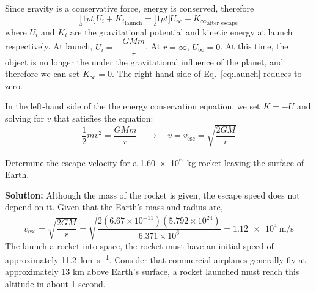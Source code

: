 Since gravity is a conservative force, energy is conserved, therefore
\begin{equation}
  \underbracket[1pt]{U_i+K_i}_\text{launch}=
  \underbracket[1pt]{U_\infty+K_\infty}_\text{after escape}
  \label{eq:launch}
\end{equation}
where $U_i$ and $K_i$ are the gravitational potential and kinetic energy at
launch respectively. At launch, $U_i=-\dfrac{GMm}r$. At $r=\infty$, $U_\infty=0$.
At this time, the object is no longer the under the gravitational influence
of the planet, and therefore we can set  $K_\infty=0$. The right-hand-side of
Eq.~\ref{eq:launch} reduces to zero.

In the left-hand side of the the energy conservation equation, we set $K=-U$
and solving for $v$ that satisfies the equation:
\begin{equation}
  \frac12mv^2=\frac{GMm}r
  \quad\longrightarrow\quad
  v=\boxed{v_\text{esc}=\sqrt{\frac{2GM}r}}
\end{equation}





\begin{example}
  Determine the escape velocity for a
  \SI{1.60e6}{\kilo\gram} rocket leaving the surface of Earth.

  \textbf{Solution:} Although the mass of the rocket is given,
  the escape speed does not depend on it. Given that the Earth's mass and
  radius are, 
  \begin{equation*}
    v_\text{esc}=\sqrt{\frac{2GM}r}
    =\sqrt{\frac{2(6.67\times10^{-11})(5.792\times10^{24})}{6.371\times10^6}}=
    \boxed{\SI{1.12e4}{\metre\per\second}}
  \end{equation*}
  The launch a rocket into space, the rocket must have an initial speed of
  approximately \SI{11.2}{\kilo\metre\per\second}. Consider that commercial
  airplanes generally fly at approximately 13 km above Earth's surface, a
  rocket launched must reach this altitude in about 1 second.
\end{example}
%
%
%





